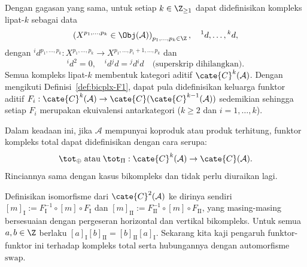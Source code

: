 \begin{catatan}\label{rem:k-fold-cplx}
	Dengan gagasan yang sama, untuk setiap $k\in\Z_{\geq1}$ dapat didefinisikan
	kompleks lipat-$k$ sebagai data
	\[ \left( X^{p_1, \ldots, p_k} \in \Obj(\mathcal{A}) \right)_{p_1, \ldots, p_k \in \Z}, \quad {}^1 d, \ldots, {}^k d, \]
	dengan ${}^i d^{p_1,\ldots,p_k}:X^{p_1,\ldots,p_k}\to
	X^{p_1,\ldots,p_i+1,\ldots,p_k}$ dan
	\[ {}^i d^2 = 0, \quad {}^i d {}^j d = {}^j d {}^i d \quad \text{(superskrip dihilangkan)}. \]
	Semua kompleks lipat-$k$ membentuk kategori aditif
	$\cate{C}^k(\mathcal{A})$. Dengan mengikuti
	Definisi~\ref{def:bicplx-F1}, dapat pula didefinisikan keluarga funktor
	aditif $F_i:\cate{C}^k(\mathcal{A})\to
	\cate{C}(\cate{C}^{k-1}(\mathcal{A}))$ sedemikian sehingga setiap $F_i$
	merupakan ekuivalensi antarkategori ($k\geq2$ dan $i=1,\ldots,k$).
	
	Dalam keadaan ini, jika $\mathcal{A}$ mempunyai koproduk atau produk
	terhitung, funktor kompleks total dapat didefinisikan dengan cara serupa:
	\[ \tot_{\oplus} \; \text{atau} \; \tot_{\Pi}: \cate{C}^k(\mathcal{A}) \to \cate{C}(\mathcal{A}). \]
	Rinciannya sama dengan kasus bikompleks dan tidak perlu diuraikan lagi.
\end{catatan}

Definisikan isomorfisme dari $\cate{C}^2(\mathcal{A})$ ke dirinya sendiri
$[m]_{\mathrm{I}}:=F_{\mathrm{I}}^{-1}\circ[m]\circ F_{\mathrm{I}}$ dan
$[m]_{\mathrm{II}}:=F_{\mathrm{II}}^{-1}\circ[m]\circ F_{\mathrm{II}}$,
yang masing-masing bersesuaian dengan pergeseran horizontal dan vertikal
bikompleks. Untuk semua $a,b\in\Z$ berlaku
$[a]_{\mathrm{I}}[b]_{\mathrm{II}}=[b]_{\mathrm{II}}[a]_{\mathrm{I}}$.
Sekarang kita kaji pengaruh funktor-funktor ini terhadap kompleks total serta
hubungannya dengan automorfisme $\mathrm{swap}$.

